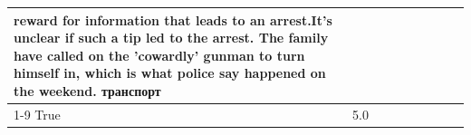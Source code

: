 \begin{table}[H]
\begin{tabular}{lllrlllll}
reward for information that leads to an arrest.It's unclear if such a tip led to the arrest. The family have called on the 'cowardly' gunman to turn himself in, which is what police say happened on the weekend. транспорт \\
\cline{1-9}
True & 5.0%
\end{tabular}
\end{table}
